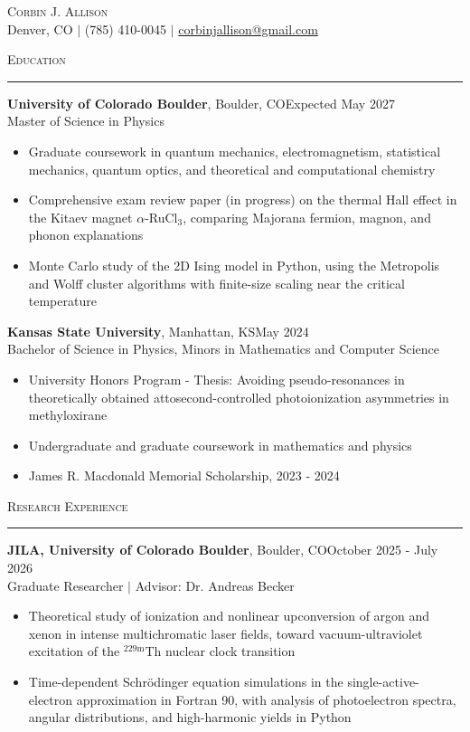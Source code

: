 \documentclass{article}
\newcommand{\sect}[1]{
\needspace{4\baselineskip}\noindent\large{\textsc{#1}}\\[-6pt]\normalsize{\noindent\rule{\textwidth}{0.5pt}}
}
\begin{document}
\noindent\begin{center}
	{\huge{\textsc{Corbin J. Allison}}}\\
	Denver, CO $ | $ (785) 410-0045 $ | $ \href{mailto:corbinjallison@gmail.com}{corbinjallison@gmail.com}
\end{center}
\sect{Education} \textbf{University of Colorado Boulder}, Boulder, CO\hfill Expected May 2027 \\
Master of Science in Physics \begin{itemize}
	\item Graduate coursework in quantum mechanics, electromagnetism, statistical mechanics, quantum optics, and theoretical and computational chemistry
	\item Comprehensive exam review paper (in progress) on the thermal Hall effect in the Kitaev magnet \mbox{$\alpha$-RuCl$_3$}, comparing Majorana fermion, magnon, and phonon explanations
	\item Monte Carlo study of the 2D Ising model in Python, using the Metropolis and Wolff cluster algorithms with finite-size scaling near the critical temperature
\end{itemize}
\textbf{Kansas State University}, Manhattan, KS\hfill May 2024 \\
Bachelor of Science in Physics, Minors in Mathematics and Computer Science \begin{itemize}
	\item University Honors Program - Thesis: Avoiding pseudo-resonances in theoretically obtained attosecond-controlled photoionization asymmetries in methyloxirane
	\item Undergraduate and graduate coursework in mathematics and physics
	\item James R. Macdonald Memorial Scholarship, 2023 - 2024
\end{itemize}
\sect{Research Experience}
\textbf{JILA, University of Colorado Boulder}, Boulder, CO\hfill October 2025 - July 2026\\
{Graduate Researcher $ | $ Advisor: Dr. Andreas Becker} \begin{itemize}
	\item Theoretical study of ionization and nonlinear upconversion of argon and xenon in intense multichromatic laser fields, toward vacuum-ultraviolet excitation of the $^{229\mathrm{m}}$Th nuclear clock transition
	\item Time-dependent Schr\"{o}dinger equation simulations in the single-active-electron approximation in Fortran 90, with analysis of photoelectron spectra, angular distributions, and high-harmonic yields in Python
\end{itemize}
\end{document}
